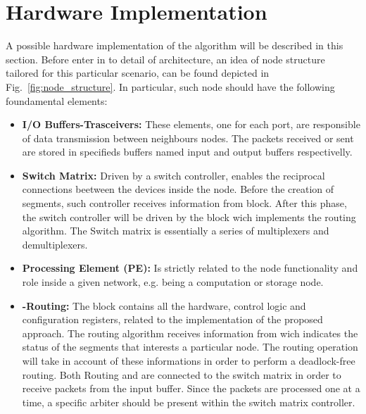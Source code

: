 \section{Hardware Implementation}
\label{sec:implementation}

A possible hardware implementation of the \disr{} algorithm will be
described in this section.  Before enter in to detail of  \disr{}
architecture,  an idea of node structure tailored for this particular
scenario, can be found depicted in Fig.~\ref{fig:node_structure}. In
particular, such node should have the following foundamental elements:

\begin{itemize}%

\item \textbf{I/O Buffers-Trasceivers:} These elements, one for
each port,  are responsible of data transmission between neighbours
nodes. The packets received or sent are stored in specifieds buffers
named input and output buffers respectivelly.

\item \textbf{Switch Matrix:} Driven by a switch controller, enables the
reciprocal connections beetween the devices inside the node. Before
the creation of segments, such controller receives information from
\disr{} block.  After this phase, the switch controller will be driven by
the block wich implements the routing algorithm. The Switch matrix is
essentially a series of multiplexers and demultiplexers.

\item  \textbf{Processing Element (PE):} Is strictly related to the node
functionality  and role inside a given network, e.g. being a
computation or storage node.

\item \textbf{\disr{}-Routing:} The \disr{} block contains all the hardware, control
logic and configuration registers, related to the implementation of the
proposed approach. The routing algorithm receives information
from \disr{}  wich indicates the status of the segments that interests a
particular node. The routing operation will take in account of these
informations in order to perform a deadlock-free routing. Both Routing
and \disr{} are connected to the switch matrix in order to receive
packets from the input buffer. Since the packets are processed one at
a time, a specific arbiter should be present within the switch matrix
controller. 

\end{itemize}%

